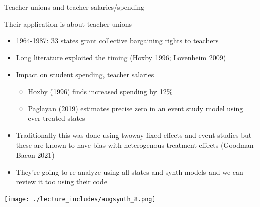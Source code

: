 \documentclass{beamer}
\begin{document}
\begin{frame}{Teacher unions and teacher salaries/spending}

Their application is about teacher unions
\begin{itemize}
\item 1964-1987: 33 states grant collective bargaining rights to teachers
\item Long literature exploited the timing (Hoxby 1996; Lovenheim 2009)
\item Impact on student spending, teacher salaries
	\begin{itemize}
	\item Hoxby (1996) finds increased spending by 12\%
	\item Paglayan (2019) estimates precise zero in an event study model using ever-treated states
	\end{itemize}
\item Traditionally this was done using twoway fixed effects and event studies but these are known to have bias with heterogenous treatment effects (Goodman-Bacon 2021)
\item They're going to re-analyze using all states and synth models and we can review it too using their code
\end{itemize}

\end{frame}





\begin{frame}
\begin{center}
\texttt{[image: ./lecture\_includes/augsynth\_8.png]}
\end{center}
\end{frame}
\end{document}
